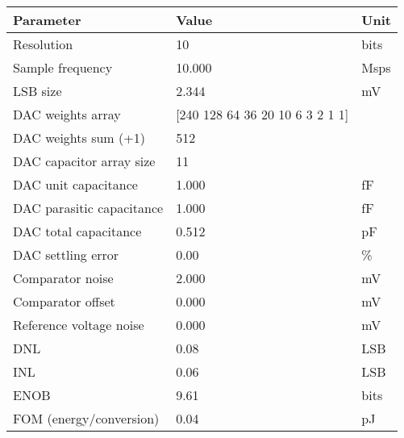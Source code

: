 \begin{tabular}{lll}
\toprule
Parameter & Value & Unit \\
\midrule
Resolution & 10 & bits \\
Sample frequency & 10.000 & Msps \\
LSB size & 2.344 & mV \\
DAC weights array & [240 128  64  36  20  10   6   3   2   1   1] &  \\
DAC weights sum (+1) & 512 &  \\
DAC capacitor array size & 11 &  \\
DAC unit capacitance & 1.000 & fF \\
DAC parasitic capacitance & 1.000 & fF \\
DAC total capacitance & 0.512 & pF \\
DAC settling error & 0.00 & \% \\
Comparator noise & 2.000 & mV \\
Comparator offset & 0.000 & mV \\
Reference voltage noise & 0.000 & mV \\
DNL & 0.08 & LSB \\
INL & 0.06 & LSB \\
ENOB & 9.61 & bits \\
FOM (energy/conversion) & 0.04 & pJ \\
\bottomrule
\end{tabular}
